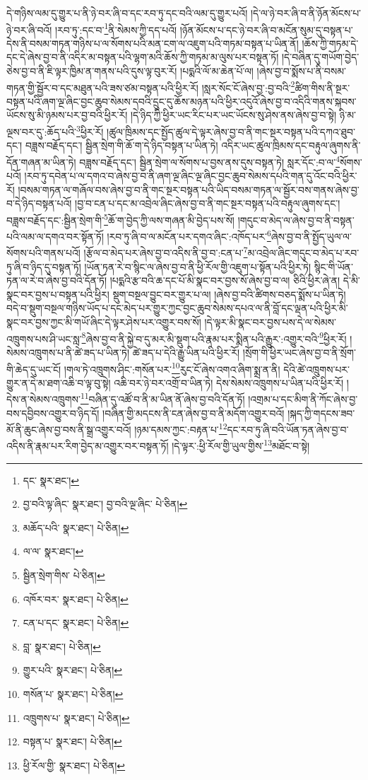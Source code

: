 དེ་གཉིས་ལམ་དུ་གྱུར་པ་ནི་ཉེ་བར་ཞི་བ་དང་རབ་ཏུ་དང་བའི་ལམ་དུ་གྱུར་པའོ། །དེ་ལ་ཉེ་བར་ཞི་བ་ནི་ཉོན་མོངས་པ་ཉེ་བར་ཞི་བའོ། །རབ་ཏུ་:དང་བ་\footnote{དང་  སྣར་ཐང་། }ནི་སེམས་ཀྱི་དད་པའོ། །ཉོན་མོངས་པ་དང་ཉེ་བར་ཞི་བ་མངོན་སུམ་དུ་བསྟན་པ་དེས་ནི་བསམ་གཏན་གཉིས་པ་ལ་སོགས་པའི་མན་ངག་ལ་འཇུག་པའི་གཏམ་བསྟན་པ་ཡིན་ནོ། །ཆོས་ཀྱི་གཏམ་དེ་དང་དེ་ཞེས་བྱ་བ་ནི་འདིར་མ་བསྟན་པའི་ལྷག་མའི་ཆོས་ཀྱི་གཏམ་མ་ལུས་པར་བསྟན་ཏོ། །དེ་བཞིན་དུ་གཡོག་བྱེད་ཅེས་བྱ་བ་ནི་ཇི་ལྟར་ཁྱིམ་ན་གནས་པའི་དུས་ལྟ་བུར་རོ། །པདྨའི་ལོ་མ་ཆེན་པོ་ལ། །ཞེས་བྱ་བ་སྨོས་པ་ནི་བསམ་གཏན་གྱི་སྦྱོར་བ་དང་མཐུན་པའི་ཟས་ཙམ་བསྟན་པའི་ཕྱིར་རོ། །སླར་སོང་ངོ་ཞེས་བྱ་:བྱ་བའི་\footnote{བྱ་བའི་ལྟ་ཞིང་  སྣར་ཐང་། བྱ་བའི་ལྔ་ཞིང་  པེ་ཅིན། }ཚིག་གིས་ནི་སྔར་བསྟན་པའི་ཞག་ལྔ་ཞིང་བྱང་ཆུབ་སེམས་དབའི་དྲུང་དུ་ཆོས་མཉན་པའི་ཕྱིར་འདུའོ་ཞེས་བྱ་བ་འདིའི་གནས་སྐབས་ཡོངས་སུ་མི་ཉམས་པར་བྱ་བའི་ཕྱིར་རོ། །དེ་ཉིད་ཀྱི་ཕྱིར་ཡང་རིང་པར་ཡང་ཡོངས་སུ་ཤེས་ནས་ཞེས་བྱ་བ་སྟེ། ཉི་མ་ལྔས་བར་དུ་:ཆོད་པའི་\footnote{མཆོད་པའི་  སྣར་ཐང་།  པེ་ཅིན། }ཕྱིར་རོ། །ཚུལ་ཁྲིམས་དང་སྤྱོད་ཚུལ་དེ་ལྟར་ཞེས་བྱ་བ་ནི་གང་སྔར་བསྟན་པའི་དཀའ་ཐུབ་དང་། བཟླས་བརྗོད་དང་། སྦྱིན་སྲེག་གི་ཆོ་ག་དེ་ཉིད་བསྟན་པ་ཡིན་ཏེ། འདིར་ཡང་ཚུལ་ཁྲིམས་དང་བརྟུལ་ཞུགས་ནི་དོན་གཞན་མ་ཡིན་ཏེ། བཟླས་བརྗོད་དང་། སྦྱིན་སྲེག་ལ་སོགས་པ་བྱས་ནས་དུས་བསྟན་ཏེ། སླར་དོང་:བ་ལ་\footnote{ལ་ལ་  སྣར་ཐང་། }སོགས་པའོ། །རབ་ཏུ་དབེན་པ་ལ་དགའ་བ་ཞེས་བྱ་བ་ནི་ཞག་ལྔ་ཞིང་ལྔ་ཞིང་བྱང་ཆུབ་སེམས་དཔའི་གན་དུ་འོང་བའི་ཕྱིར་རོ། །བསམ་གཏན་ལ་གཞོལ་བས་ཞེས་བྱ་བ་ནི་གང་སྔར་བསྟན་པའི་ཡིད་བསམ་གཏན་ལ་སྦྱོར་བས་གནས་ཞེས་བྱ་བ་དེ་ཉིད་བསྟན་པའོ། །བྱ་བ་ངན་པ་དང་མ་འབྲེལ་ཞིང་ཞེས་བྱ་བ་ནི་གང་སྔར་བསྟན་པའི་བརྟུལ་ཞུགས་དང་། བཟླས་བརྗོད་དང་:སྦྱིན་སྲེག་གི་\footnote{སྦྱིན་སྲེག་གིས་  པེ་ཅིན། }ཆོ་ག་བྱེད་ཀྱི་ལས་གཞན་མི་བྱེད་པས་སོ། །གདུང་བ་མེད་ལ་ཞེས་བྱ་བ་ནི་བསྟན་པའི་ལམ་ལ་དགའ་བར་སྟོན་ཏོ། །རབ་ཏུ་ཞི་བ་ལ་མངོན་པར་དགའ་ཞིང་:འཁོད་པར་\footnote{འཁོར་བར་  སྣར་ཐང་།  པེ་ཅིན། }ཞེས་བྱ་བ་ནི་སྤྱོད་ཡུལ་ལ་སོགས་པའི་གནས་པའོ། །རྩོལ་བ་མེད་པར་ཞེས་བྱ་བ་འདིས་ནི་བྱ་བ་:ངན་པ་\footnote{ངན་པ་དང་  སྣར་ཐང་།  པེ་ཅིན། }མ་འབྲེལ་ཞིང་གདུང་བ་མེད་པ་རབ་ཏུ་ཞི་བ་ཉིད་དུ་བསྟན་ཏོ། །ཡོན་ཏན་རེ་བ་སྙིང་ལ་ཞེས་བྱ་བ་ནི་ཕྱི་རོལ་གྱི་འཇུག་པ་སྟོན་པའི་ཕྱིར་ཏེ། སྙིང་གི་ཡོན་ཏན་ལ་རེ་བ་ཞེས་བྱ་བའི་དོན་ཏོ། །པདྨའི་རྩ་བའི་ཆ་དང་པོ་མི་སྣང་བར་བྱས་སོ་ཞེས་བྱ་བ་ལ། ཅིའི་ཕྱིར་ཞེ་ན། དེ་མི་སྣང་བར་བྱས་པ་བསྟན་པའི་ཕྱིར། སྡུག་བསྔལ་བྱུང་བར་གྱུར་པ་ལ། །ཞེས་བྱ་བའི་ཚིགས་བཅད་སྨོས་པ་ཡིན་ཏེ། བདེ་བ་སྡུག་བསྔལ་གཉིས་ཡོད་པ་དང་མེད་པར་གྱུར་ཀྱང་བྱང་ཆུབ་སེམས་དཔའ་ལ་ནི་བློ་དང་ལྡན་པའི་ཕྱིར་མི་སྣང་བར་བྱས་ཀྱང་མི་གཡོ་ཞིང་དེ་ལྟར་ཤེས་པར་འགྱུར་བས་སོ། །དེ་ལྟར་མི་སྣང་བར་བྱས་པས་དེ་ལ་སེམས་འཁྲུགས་པས་ཤི་ཡང་སླ་\footnote{བླ་  སྣར་ཐང་།  པེ་ཅིན། }ཞེས་བྱ་བ་ནི་སྐྱེ་བ་དུ་མར་མི་སྡུག་པའི་རྣམ་པར་སྨིན་པའི་རྒྱུར་:འགྱུར་བའི་\footnote{གྱུར་པའི་  སྣར་ཐང་།  པེ་ཅིན། }ཕྱིར་རོ། །སེམས་འཁྲུགས་པ་ནི་ཚེ་ཟད་པ་ཡིན་ཏེ། ཚེ་ཟད་པ་དེའི་རྒྱུ་ཡིན་པའི་ཕྱིར་རོ། །སྲོག་གི་ཕྱིར་ཡང་ཞེས་བྱ་བ་ནི་སྲོག་གི་ཆེད་དུ་ཡང་ངོ། །གལ་ཏེ་འཁྲུགས་ཤིང་:གསོན་པར་\footnote{གསོན་པ་  སྣར་ཐང་།  པེ་ཅིན། }རུང་ངོ་ཞེས་འགའ་ཞིག་སྨྲ་ན་ནི། དེའི་ཚེ་འཁྲུགས་པར་གྱུར་ན་དེ་མ་ཐག་འཆི་བ་ལྟ་བུ་སྟེ། འཆི་བར་ཉེ་བར་འགྲོ་བ་ཡིན་ཏེ། དེས་སེམས་འཁྲུགས་པ་ཡིན་པའི་ཕྱིར་རོ། །དེས་ན་སེམས་འཁྲུགས་\footnote{འཁྲུགས་པ་  སྣར་ཐང་།  པེ་ཅིན། }བཞིན་དུ་འཚོ་བ་ནི་མ་ཡིན་ནོ་ཞེས་བྱ་བའི་དོན་ཏོ། །འགྲམ་པ་དང་མིག་ནི་ཀོང་ཞེས་བྱ་བས་དབྱིབས་འགྱུར་བ་ཉིད་དོ། །བཞིན་གྱི་མདངས་ནི་ངན་ཞེས་བྱ་བ་ནི་མདོག་འགྱུར་བའོ། །སྐད་ཀྱི་གདངས་ཟབ་མོ་ནི་ཆུང་ཞེས་བྱ་བས་ནི་སྒྲ་འགྱུར་བའོ། །ཉམ་དམས་ཀྱང་:བརྟན་པ་\footnote{བསྟན་པ་  སྣར་ཐང་།  པེ་ཅིན། }དང་རབ་ཏུ་ཞི་བའི་ཡོན་ཏན་ཞེས་བྱ་བ་འདིས་ནི་རྣམ་པར་རིག་བྱེད་མ་འགྱུར་བར་བསྟན་ཏོ། །དེ་ལྟར་:ཕྱི་རོལ་གྱི་ཡུལ་གྱིས་\footnote{ཕྱི་རོལ་གྱི་  སྣར་ཐང་།  པེ་ཅིན། }མཐོང་བ་སྟེ། 